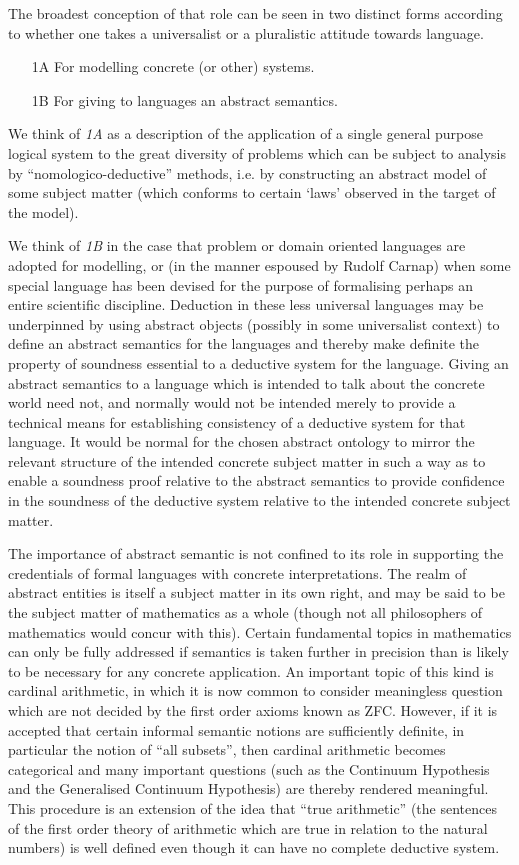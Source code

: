 The broadest conception of that role can be seen in two distinct forms according to whether one takes a universalist or a pluralistic attitude towards language.

\begin{itemize}
\item[1A] For modelling concrete (or other) systems.
\item[1B] For giving to languages an abstract semantics.
\end{itemize}

We think of \emph{1A} as a description of the application of a single general purpose logical system to the great diversity of problems which can be subject to analysis by ``nomologico-deductive'' methods, i.e. by constructing an abstract model of some subject matter (which conforms to certain `laws' observed in the target of the model).

We think of \emph{1B} in the case that problem or domain oriented languages are adopted for modelling, or (in the manner espoused by Rudolf Carnap) when some special language has been devised for the purpose of formalising perhaps an entire scientific discipline.
Deduction in these less universal languages may be underpinned by using abstract objects (possibly in some universalist context) to define an abstract semantics for the languages and thereby make definite the property of soundness essential to a deductive system for the language.
Giving an abstract semantics to a language which is intended to talk about the concrete world need not, and normally would not be intended merely to provide a technical means for establishing consistency of a deductive system for that language.
It would be normal for the chosen abstract ontology to mirror the relevant structure of the intended concrete subject matter in such a way as to enable a soundness proof relative to the abstract semantics to provide confidence in the soundness of the deductive system relative to the intended concrete subject matter.

The importance of abstract semantic is not confined to its role in supporting the credentials of formal languages with concrete interpretations.
The realm of abstract entities is itself a subject matter in its own right, and may be said to be the subject matter of mathematics as a whole (though not all philosophers of mathematics would concur with this).
Certain fundamental topics in mathematics can only be fully addressed if semantics is taken further in precision than is likely to be necessary for any concrete application.
An important topic of this kind is cardinal arithmetic, in which it is now common to consider meaningless question which are not decided by the first order axioms known as ZFC.
However, if it is accepted that certain informal semantic notions are sufficiently definite, in particular the notion of ``all subsets'', then cardinal arithmetic becomes categorical and many important questions (such as the Continuum Hypothesis and the Generalised Continuum Hypothesis) are thereby rendered meaningful.
This procedure is an extension of the idea that ``true arithmetic'' (the sentences of the first order theory of arithmetic which are true in relation to the natural numbers) is well defined even though it can have no complete deductive system.

